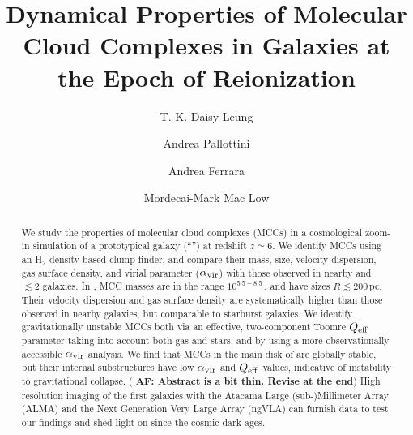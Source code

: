 \IfFileExists{emulateapjlegacy.cls}{\documentclass[iop]{emulateapjlegacy}}{\documentclass[iop]{emulateapj}}
\newcommand{\AF}[1]{({\bf \color{afcolor} AF: #1})}
\begin{document}
\title{Dynamical Properties of Molecular Cloud Complexes in Galaxies at the Epoch of Reionization}

\author{T. K. Daisy Leung}
\author{Andrea Pallottini}
\author{Andrea Ferrara}
\author{Mordecai-Mark Mac Low}


\begin{abstract}
We study the properties of molecular cloud complexes (MCCs) in a cosmological zoom-in simulation of a
prototypical galaxy (``\flower'') at redshift $z\simeq 6$.
%
We identify MCCs using an H$_2$ density-based clump finder, and compare their mass, size, velocity dispersion, gas surface density, and virial parameter ($\alpha_{\rm vir}$) with those observed in nearby and \z$\lesssim 2$ galaxies.
%
In \flower, MCC masses are in the range $10^{5.5-8.5}$\,\Msun, and have sizes $R\lesssim200$\,pc. Their velocity dispersion and gas surface density are systematically higher than those observed in nearby galaxies, but comparable to starburst galaxies.
%
We identify gravitationally unstable MCCs both via an effective, two-component Toomre $Q_{\rm eff}$ parameter 
    taking into account both gas and stars, 
and by using a more observationally accessible $\alpha_{\rm vir}$ analysis. We find that MCCs in the main disk of \flower are globally stable, but their internal substructures have low $\alpha_{\rm vir}$ and $Q_{\rm eff}$ values, indicative of
    instability to gravitational 
collapse.
%
\AF{Abstract is a bit thin. Revise at the end}
High resolution imaging of the first galaxies with the Atacama Large (sub-)Millimeter Array (ALMA) and the Next Generation Very Large Array (ngVLA) can furnish 
data to test our findings and shed light on \SF since the cosmic dark ages.
\end{abstract}
\end{document}
